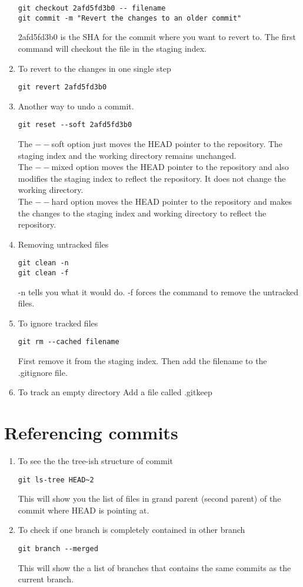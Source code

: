 \documentclass[paper=a4, fontsize=12pt]{scrartcl}
\begin{document}
\begin{enumerate}
\begin{lstlisting}
git checkout 2afd5fd3b0 -- filename
git commit -m "Revert the changes to an older commit"
\end{lstlisting}
2afd5fd3b0 is the SHA for the commit where you want to revert to. The first command will checkout the file in the staging index.
\item To revert to the changes in one single step
\begin{lstlisting}
git revert 2afd5fd3b0
\end{lstlisting}
\item Another way to undo a commit.
\begin{lstlisting}
git reset --soft 2afd5fd3b0 
\end{lstlisting}
The $--$soft option just moves the HEAD pointer to the repository. The staging index and the working directory remains unchanged.\\
The $--$mixed option moves the HEAD pointer to the repository and also modifies the staging index to reflect the repository. It does not change the working directory.\\
The $--$hard option moves the HEAD pointer to the repository and makes the changes to the staging index and working directory to reflect the repository.
\item Removing untracked files
\begin{lstlisting}
git clean -n
git clean -f
\end{lstlisting}
-n tells you what it would do.
-f forces the command to remove the untracked files.
\item To ignore tracked files
\begin{lstlisting}
git rm --cached filename
\end{lstlisting}
First remove it from the staging index. Then add the filename to the .gitignore file.
\item To track an empty directory
Add a file called .gitkeep
\end{enumerate}

\section*{Referencing commits}
\begin{enumerate}
\item To see the the tree-ish structure of commit
\begin{lstlisting}
git ls-tree HEAD~2
\end{lstlisting}
This will show you the list of files in grand parent (second parent) of the commit where HEAD is pointing at.
\item To check if one branch is completely contained in other branch
\begin{lstlisting}
git branch --merged
\end{lstlisting}
This will show the a list of branches that contains the same commits as the current branch.
\end{enumerate}
\end{document}
